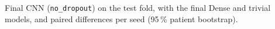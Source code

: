 \begin{table}[htbp]
\centering
\caption[1D CNN: final model (test)]{Final CNN (\texttt{no\_dropout}) on the test fold, with the final Dense and trivial models, and paired differences per seed (95\,\% patient bootstrap).}
\label{tab:cnn_final}
\small
\begin{adjustbox}{max width=\textwidth}

\end{adjustbox}
\end{table}
